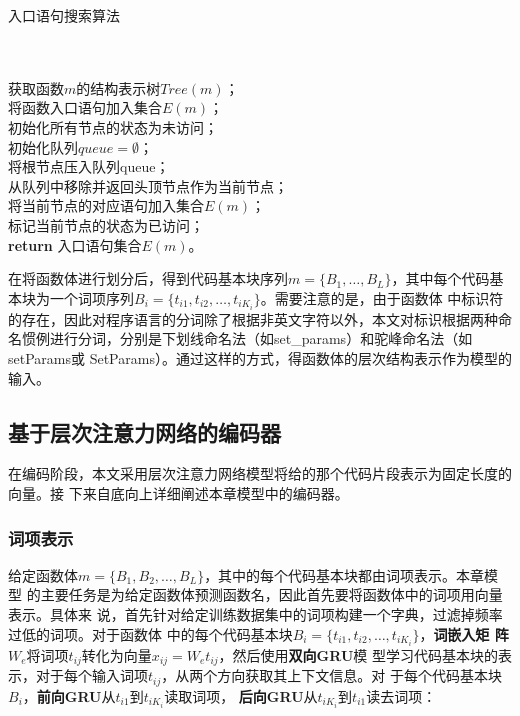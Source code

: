 \begin{algorithm}[H]
\caption{入口语句搜索算法}\label{alg:block}
\\
\\
获取函数$m$的结构表示树$Tree(m)$；\\
将函数入口语句加入集合$E(m)$；\\
初始化所有节点的状态为未访问；\\
初始化队列$queue=\emptyset$；\\
将根节点压入队列queue；\\
 {
    从队列中移除并返回头顶节点作为当前节点；\\
     {
         {
            将当前节点的对应语句加入集合$E(m)$；\\
        }
    }
    标记当前节点的状态为已访问；\\
}
\textbf{return} 入口语句集合$E(m)$。\\
\end{algorithm}

在将函数体进行划分后，得到代码基本块序列$m=\{B_1, \dots, B_L\}$，其中每个代码基
本块为一个词项序列$B_i=\{t_{i1},t_{i2},\dots,t_{iK_i}\}$。需要注意的是，由于函数体
中标识符的存在，因此对程序语言的分词除了根据非英文字符以外，本文对标识根据两种命
名惯例进行分词，分别是下划线命名法（如set\_params）和驼峰命名法（如setParams或
SetParams）。通过这样的方式，得函数体的层次结构表示作为模型的输入。

\subsection{基于层次注意力网络的编码器}
在编码阶段，本文采用层次注意力网络模型将给的那个代码片段表示为固定长度的向量。接
下来自底向上详细阐述本章模型中的编码器。

\subsubsection{词项表示}
给定函数体$m=\{B_1,B_2,\dots,B_L\}$，其中的每个代码基本块都由词项表示。本章模型
的主要任务是为给定函数体预测函数名，因此首先要将函数体中的词项用向量表示。具体来
说，首先针对给定训练数据集中的词项构建一个字典，过滤掉频率过低的词项。对于函数体
中的每个代码基本块$B_i=\{t_{i1},t_{i2},\dots,t_{iK_i}\}$，\textbf{词嵌入矩
阵}$W_e$将词项$t_{ij}$转化为向量$x_{ij}=W_e t_{ij}$，然后使用\textbf{双向GRU}模
型学习代码基本块的表示，对于每个输入词项$t_{ij}$，从两个方向获取其上下文信息。对
于每个代码基本块$B_i$，\textbf{前向GRU}从$t_{i1}$到$t_{iK_i}$读取词项，
\textbf{后向GRU}从$t_{iK_i}$到$t_{i1}$读去词项：

